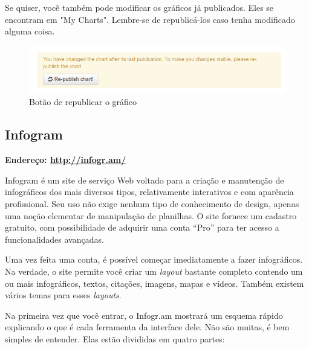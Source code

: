 \documentclass[12pt,onecolumn]{article}
\begin{document}
    Se quiser, você também pode modificar os gráficos já publicados. Eles se encontram
    em "My Charts". Lembre-se de republicá-los caso tenha modificado alguma coisa.

  \begin{figure}[H]
    \begin{center}
      \includegraphics[scale=0.5]{datawrapper-republish}
      \caption{Botão de republicar o gráfico}
      \label{fig:datawrapper-republish}
    \end{center}
  \end{figure}

  \subsection{Infogram}
    \textbf{Endereço: \url{http://infogr.am/}}
    
    Infogram é um site de serviço Web voltado para a criação e manutenção de
    infográficos dos mais diversos tipos, relativamente interativos e com
    aparência profissional. Seu uso não exige nenhum tipo de conhecimento de
    design, apenas uma noção elementar de manipulação de planilhas. O site
    fornece um cadastro gratuito, com possibilidade de adquirir uma conta
    ``Pro'' para ter acesso a funcionalidades avançadas.
    
    Uma vez feita uma conta, é possível começar imediatamente a fazer
    infográficos. Na verdade, o site permite você criar um \textit{layout}
    bastante completo contendo um ou mais infográficos, textos, citações, imagens,
    mapas e vídeos. Também existem vários temas para esses \textit{layouts}.
    
    Na primeira vez que você entrar, o Infogr.am mostrará um esquema rápido
    explicando o que é cada ferramenta da interface dele. Não são muitas, é bem
    simples de entender. Elas estão divididas em quatro partes:
    
\end{document}
